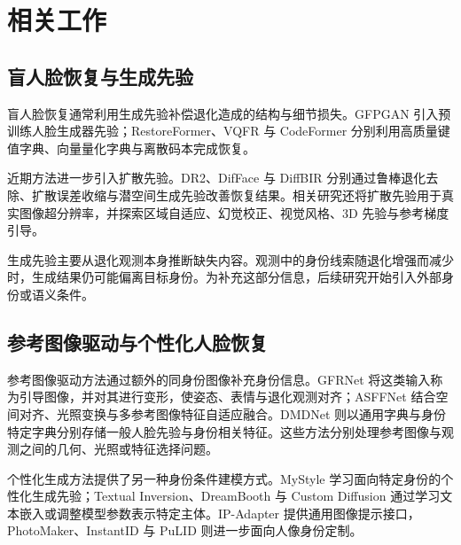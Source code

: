 \documentclass[journal]{IEEEtran}
\begin{document}
\section{相关工作}
\label{sec:main_related}

\subsection{盲人脸恢复与生成先验}
盲人脸恢复通常利用生成先验补偿退化造成的结构与细节损失\cite{wang2021gfpgan,zhou2022codeformer,lin2024diffbir}。GFPGAN 引入预训练人脸生成器先验\cite{wang2021gfpgan}；RestoreFormer、VQFR 与 CodeFormer 分别利用高质量键值字典、向量量化字典与离散码本完成恢复\cite{wang2022restoreformer,gu2022vqfr,zhou2022codeformer}。

近期方法进一步引入扩散先验。DR2、DifFace 与 DiffBIR 分别通过鲁棒退化去除、扩散误差收缩与潜空间生成先验改善恢复结果\cite{wang2023dr2,yue2022difface,lin2024diffbir}。相关研究还将扩散先验用于真实图像超分辨率，并探索区域自适应、幻觉校正、视觉风格、3D 先验与参考梯度引导\cite{wang2024stablesr,suin2024diffuse,gao2024diffmac,zhu2024visualstyle,lu2024threepriors,min2024pdgrad}。

生成先验主要从退化观测本身推断缺失内容。观测中的身份线索随退化增强而减少时，生成结果仍可能偏离目标身份\cite{suin2024diffuse,liu2025faceme,niu2026iconface}。为补充这部分信息，后续研究开始引入外部身份或语义条件\cite{li2018gfrnet,liu2025faceme,xie2023tfrgan,an2026tbfr}。

\subsection{参考图像驱动与个性化人脸恢复}
参考图像驱动方法通过额外的同身份图像补充身份信息。GFRNet 将这类输入称为引导图像，并对其进行变形，使姿态、表情与退化观测对齐；ASFFNet 结合空间对齐、光照变换与多参考图像特征自适应融合\cite{li2018gfrnet,li2020asffnet}。DMDNet 则以通用字典与身份特定字典分别存储一般人脸先验与身份相关特征\cite{li2022dmdnet}。这些方法分别处理参考图像与观测之间的几何、光照或特征选择问题。

个性化生成方法提供了另一种身份条件建模方式。MyStyle 学习面向特定身份的个性化生成先验\cite{nitzan2022mystyle}；Textual Inversion、DreamBooth 与 Custom Diffusion 通过学习文本嵌入或调整模型参数表示特定主体\cite{gal2023textualinversion,ruiz2023dreambooth,kumari2023customdiffusion}。IP-Adapter 提供通用图像提示接口，PhotoMaker、InstantID 与 PuLID 则进一步面向人像身份定制\cite{ye2023ipadapter,li2024photomaker,wang2024instantid,guo2024pulid}。
\end{document}
